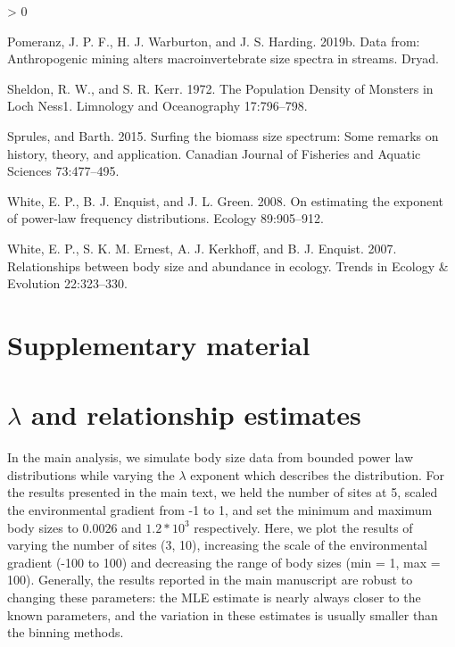 \documentclass[
]{article}
\newcommand{\beginsupplement}{ \setcounter{table}{0} \renewcommand{\thetable}{S\arabic{table}} \setcounter{figure}{0} \renewcommand{\thefigure}{S\arabic{figure}}}
\newlength{\cslhangindent}
\newenvironment{CSLReferences}[2] %
 {%
  \setlength{\parindent}{0pt}
  \ifodd #1 \everypar{\setlength{\hangindent}{\cslhangindent}}\ignorespaces\fi
  \ifnum #2 > 0
  \setlength{\parskip}{#2\baselineskip}
  \fi
 }%
 {}
\begin{document}
\begin{CSLReferences}{1}{0}
\leavevmode\hypertarget{ref-Pomeranz2019}{}%
Pomeranz, J. P. F., H. J. Warburton, and J. S. Harding. 2019b. Data
from: {Anthropogenic} mining alters macroinvertebrate size spectra in
streams. {Dryad}.

\leavevmode\hypertarget{ref-Sheldon1972}{}%
Sheldon, R. W., and S. R. Kerr. 1972. The {Population Density} of
{Monsters} in {Loch Ness1}. Limnology and Oceanography 17:796--798.

\leavevmode\hypertarget{ref-sprules2015}{}%
Sprules, and Barth. 2015. Surfing the biomass size spectrum: Some
remarks on history, theory, and application. Canadian Journal of
Fisheries and Aquatic Sciences 73:477--495.

\leavevmode\hypertarget{ref-white2008}{}%
White, E. P., B. J. Enquist, and J. L. Green. 2008. On estimating the
exponent of power-law frequency distributions. Ecology 89:905--912.

\leavevmode\hypertarget{ref-White2007}{}%
White, E. P., S. K. M. Ernest, A. J. Kerkhoff, and B. J. Enquist. 2007.
Relationships between body size and abundance in ecology. Trends in
Ecology \& Evolution 22:323--330.

\end{CSLReferences}

\newpage

\hypertarget{supplementary-material}{%
\section*{Supplementary material}\label{supplementary-material}}

\beginsupplement

\hypertarget{lambda-and-relationship-estimates}{%
\section{\texorpdfstring{\(\lambda\) and relationship
estimates}{\textbackslash lambda and relationship estimates}}\label{lambda-and-relationship-estimates}}

In the main analysis, we simulate body size data from bounded power law
distributions while varying the \(\lambda\) exponent which describes the
distribution. For the results presented in the main text, we held the
number of sites at 5, scaled the environmental gradient from -1 to 1,
and set the minimum and maximum body sizes to \(0.0026\) and
\(1.2 *10^3\) respectively. Here, we plot the results of varying the
number of sites (3, 10), increasing the scale of the environmental
gradient (-100 to 100) and decreasing the range of body sizes (min = 1,
max = 100). Generally, the results reported in the main manuscript are
robust to changing these parameters: the MLE estimate is nearly always
closer to the known parameters, and the variation in these estimates is
usually smaller than the binning methods.
\end{document}
